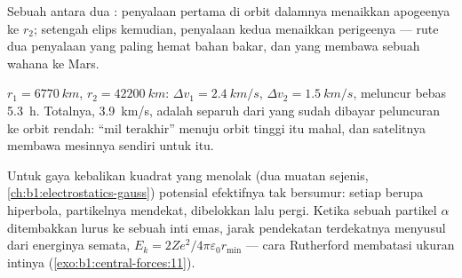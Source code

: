 \begin{omfigure}

{\small Sebuah  antara dua : penyalaan
pertama di orbit dalamnya menaikkan apogeenya ke $r_2$; setengah elips
kemudian, penyalaan kedua menaikkan perigeenya --- rute dua penyalaan
yang paling hemat bahan bakar, dan yang membawa sebuah wahana ke Mars.}
\end{omfigure}

\begin{example}\label{ex:b1:central-forces:leogeo}
$r_1 = \qty{6770}{km}$, $r_2 = \qty{42200}{km}$: $\Delta v_1 = \qty{2.4}{km/s}$,
$\Delta v_2 = \qty{1.5}{km/s}$, meluncur bebas \qty{5.3}{h}. Totalnya,
\qty{3.9}{km/s}, adalah separuh dari yang sudah dibayar peluncuran ke
orbit rendah: ``mil terakhir'' menuju orbit tinggi itu mahal, dan
satelitnya membawa mesinnya sendiri untuk itu.
\end{example}

\begin{remark}\label{rem:b1:central-forces:rutherford}
Untuk gaya kebalikan kuadrat yang menolak (dua muatan sejenis,
\cref{ch:b1:electrostatics-gauss}) potensial efektifnya tak bersumur:
setiap  berupa hiperbola, partikelnya mendekat, dibelokkan
lalu pergi. Ketika sebuah partikel $\alpha$ ditembakkan lurus ke sebuah
inti emas, jarak pendekatan terdekatnya menyusul dari energinya semata,
$E_k =
2Ze^2/4\pi\varepsilon_0 r_{\min}$ --- cara Rutherford membatasi ukuran
intinya (\cref{exo:b1:central-forces:11}).
\end{remark}

